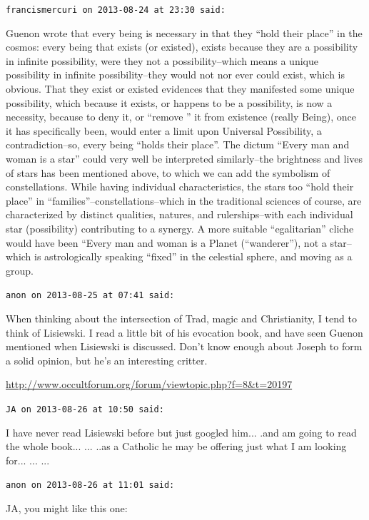 \begin{footnotesize}
\begin{sffamily}
\texttt{francismercuri on 2013-08-24 at 23:30 said:}

Guenon wrote that every being is necessary in that they ``hold their place'' in the cosmos: every being that exists (or existed), exists because they are a possibility in infinite possibility, were they not a possibility--which means a unique possibility in infinite possibility--they would not nor ever could exist, which is obvious. That they exist or existed evidences that they manifested some unique possibility, which because it exists, or happens to be a possibility, is now a necessity, because to deny it, or ``remove '' it from existence (really Being), once it has specifically been, would enter a limit upon Universal Possibility, a contradiction--so, every being ``holds their place''. The dictum ``Every man and woman is a star'' could very well be interpreted similarly--the brightness and lives of stars has been mentioned above, to which we can add the symbolism of constellations. While having individual characteristics, the stars too ``hold their place'' in ``families''--constellations--which in the traditional sciences of course, are characterized by distinct qualities, natures, and rulerships--with each individual star (possibility) contributing to a synergy. A more suitable ``egalitarian'' cliche would have been ``Every man and woman is a Planet (``wanderer''), not a star--which is astrologically speaking ``fixed'' in the celestial sphere, and moving as a group.

\hfill

\texttt{anon on 2013-08-25 at 07:41 said:}

When thinking about the intersection of Trad, magic and Christianity, I tend to think of Lisiewski. I read a little bit of his evocation book, and have seen Guenon mentioned when Lisiewski is discussed. Don't know enough about Joseph to form a solid opinion, but he's an interesting critter.

\url{http://www.occultforum.org/forum/viewtopic.php?f=8\&t=20197}


\hfill

\texttt{JA on 2013-08-26 at 10:50 said:}

I have never read Lisiewski before but just googled him... .and am going to read the whole book... ... ..as a Catholic he may be offering just what I am looking for... ... ... 

\hfill

\texttt{anon on 2013-08-26 at 11:01 said:}

JA, you might like this one:


\end{sffamily}
\end{footnotesize}
